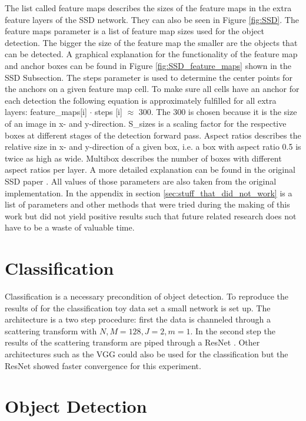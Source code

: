 The list called feature maps describes the sizes of the feature maps in the extra feature layers of the SSD network. They can also be seen in Figure \ref{fig:SSD}. 
The feature maps parameter is a list of feature map sizes used for the object detection. The bigger the size of the feature map the smaller are the objects that can be detected. A graphical explanation for the functionality of the feature map and anchor boxes can be found in Figure \ref{fig:SSD_feature_maps} shown in the SSD Subsection.
The steps parameter is used to determine the center points for the anchors on a given feature map cell. To make sure all cells have an anchor for each detection the following equation is approximately fulfilled for all extra layers: feature\_maps[i] $\cdot$ steps [i] $\approx$ 300. The 300 is chosen because it is the size of an image in x- and y-direction. S\_sizes is a scaling factor for the respective boxes at different stages of the detection forward pass. Aspect ratios describes the relative size in x- and y-direction of a given box, i.e. a box with aspect ratio 0.5 is twice as high as wide. Multibox describes the number of boxes with different aspect ratios per layer. A more detailed explanation can be found in the original SSD paper \cite{SSD}. All values of those parameters are also taken from the original implementation. In the appendix in section \ref{sec:stuff_that_did_not_work} is a list of parameters and other methods that were tried during the making of this work but did not yield positive results such that future related research does not have to be a waste of valuable time. 


\section{Classification}
\label{sec:classification_experiments}

Classification is a necessary precondition of object detection. To reproduce the results of \cite{ScalingTheScatteringTransform2017} for the classification toy data set a small network is set up. The architecture is a two step procedure: first the data is channeled through a scattering transform with $N,M=128, J=2, m=1$. In the second step the results of the scattering transform are piped through a ResNet \cite{ResNet15}. Other architectures such as the VGG could also be used for the classification but the ResNet showed faster convergence for this experiment. 

\section{Object Detection}
\label{sec:object_detection_experiments}

